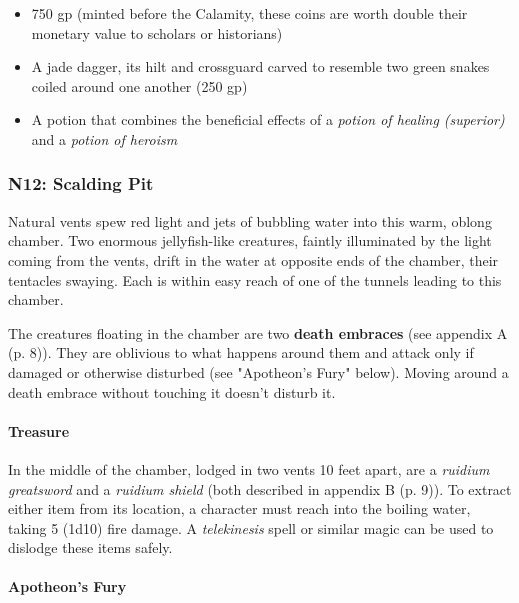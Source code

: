 \documentclass[letterpaper, 11pt, bg=full, twocolumn]{dndbook}
\begin{document}
\begin{itemize}
\item 750 gp (minted before the Calamity, these coins are worth double their monetary value to scholars or historians)
\item A jade dagger, its hilt and crossguard carved to resemble two green snakes coiled around one another (250 gp)
\item A potion that combines the beneficial effects of a \textit{potion of healing (superior)} and a \textit{potion of heroism}
\end{itemize}

\subsubsection{N12: Scalding Pit}

\begin{DndReadAloud}
Natural vents spew red light and jets of bubbling water into this warm, oblong chamber. Two enormous jellyfish-like creatures, faintly illuminated by the light coming from the vents, drift in the water at opposite ends of the chamber, their tentacles swaying. Each is within easy reach of one of the tunnels leading to this chamber.
\end{DndReadAloud}


The creatures floating in the chamber are two \textbf{death embraces} (see appendix A (p. 8)). They are oblivious to what happens around them and attack only if damaged or otherwise disturbed (see "Apotheon's Fury" below). Moving around a death embrace without touching it doesn't disturb it.

\paragraph{Treasure}

In the middle of the chamber, lodged in two vents 10 feet apart, are a \textit{ruidium greatsword} and a \textit{ruidium shield} (both described in appendix B (p. 9)). To extract either item from its location, a character must reach into the boiling water, taking 5 (1d10) fire damage. A \textit{telekinesis} spell or similar magic can be used to dislodge these items safely.

\paragraph{Apotheon's Fury}
\end{document}

